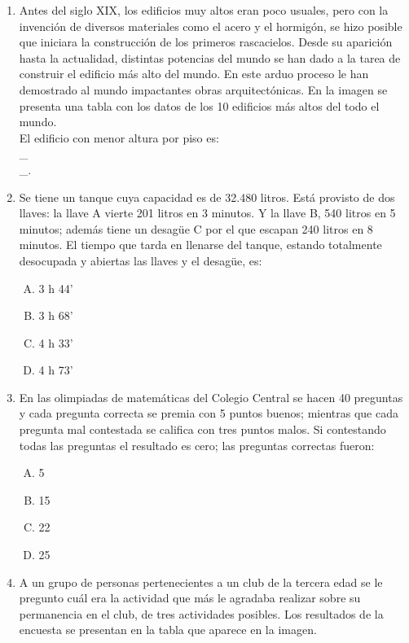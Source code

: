 \begin{enumerate}
\item Antes  del siglo XIX, los edificios muy altos eran poco usuales, pero con la invención de diversos materiales como el acero y el hormigón, se hizo posible que iniciara la construcción de los primeros rascacielos. Desde su aparición hasta la actualidad, distintas potencias del mundo se han dado a la tarea de construir el edificio más alto del mundo. En este arduo proceso le han demostrado al mundo impactantes obras arquitectónicas. En la imagen se presenta una tabla con los datos de los 10 edificios más altos del todo el mundo.\label{vic-6} \label{pregunta_altura} \\

El edificio con menor altura por piso es:\hrulefill\\
\_\hrulefill\hrulefill\\
\_\hrulefill.

\item Se tiene un tanque cuya capacidad es de 32.480 litros. Está provisto de dos llaves: la llave A vierte 201 litros en 3 minutos. Y la llave B, 540 litros en 5 minutos; además tiene un desagüe C por el que escapan 240 litros en 8 minutos. El tiempo que tarda en llenarse del tanque, estando totalmente desocupada y abiertas las llaves y el desagüe, es: \label{vic-7}

\begin{enumerate}[(A)]
\item 3 h 44'
\item 3 h 68'
\item 4 h 33'
\item 4 h 73'
\end{enumerate}

\newpage
\item En las olimpiadas de matemáticas del Colegio Central se hacen 40 preguntas y cada pregunta correcta se premia con 5 puntos buenos; mientras que cada pregunta mal contestada se califica con tres puntos malos. Si contestando todas las preguntas el resultado es cero; las preguntas correctas fueron: \label{vic-8}
\begin{enumerate}[(A)]
\item 5
\item 15
\item 22
\item 25
\end{enumerate}
\item A un grupo de personas pertenecientes a un club de la tercera edad se le pregunto cuál era la actividad  que más le agradaba realizar sobre su permanencia en el club, de tres actividades posibles. Los resultados de la encuesta se presentan en la tabla que aparece en la imagen.\label{vic-9}


\end{enumerate}

